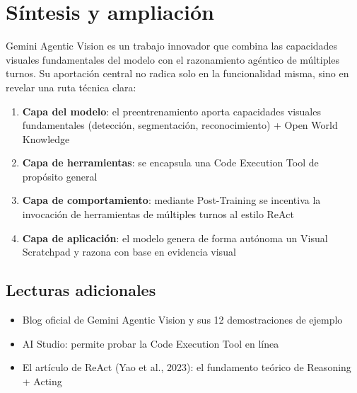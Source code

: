 \section{Síntesis y ampliación}

Gemini Agentic Vision es un trabajo innovador que combina las capacidades visuales fundamentales del modelo con el razonamiento agéntico de múltiples turnos. Su aportación central no radica solo en la funcionalidad misma, sino en revelar una ruta técnica clara:

\begin{enumerate}
    \item \textbf{Capa del modelo}: el preentrenamiento aporta capacidades visuales fundamentales (detección, segmentación, reconocimiento) + Open World Knowledge
    \item \textbf{Capa de herramientas}: se encapsula una Code Execution Tool de propósito general
    \item \textbf{Capa de comportamiento}: mediante Post-Training se incentiva la invocación de herramientas de múltiples turnos al estilo ReAct
    \item \textbf{Capa de aplicación}: el modelo genera de forma autónoma un Visual Scratchpad y razona con base en evidencia visual
\end{enumerate}

\subsection{Lecturas adicionales}

\begin{itemize}
    \item Blog oficial de Gemini Agentic Vision y sus 12 demostraciones de ejemplo
    \item AI Studio: permite probar la Code Execution Tool en línea
    \item El artículo de ReAct (Yao et al., 2023): el fundamento teórico de Reasoning + Acting
\end{itemize}




